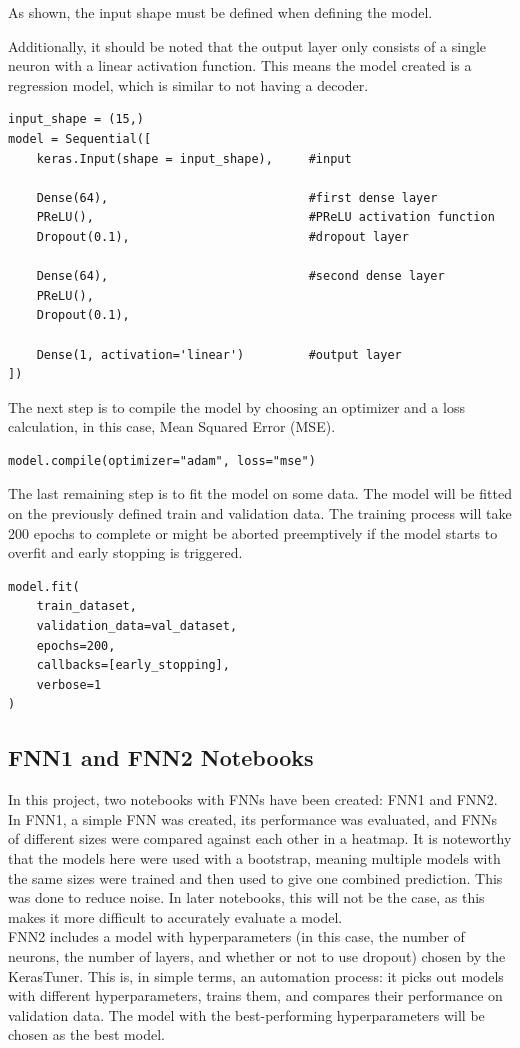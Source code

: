 \documentclass{article}
\begin{document}
As shown, the input shape must be defined when defining the model.

Additionally, it should be noted that the output layer only consists of a single neuron with a linear activation function. This means the model created is a regression model, which is similar to not having a decoder.
\begin{Verbatim}
input_shape = (15,)
model = Sequential([
    keras.Input(shape = input_shape),     #input

    Dense(64),                            #first dense layer
    PReLU(),                              #PReLU activation function
    Dropout(0.1),                         #dropout layer

    Dense(64),                            #second dense layer
    PReLU(),                                
    Dropout(0.1),                           

    Dense(1, activation='linear')         #output layer
])
\end{Verbatim}

The next step is to compile the model by choosing an optimizer and a loss calculation, in this case, Mean Squared Error (MSE).
\begin{Verbatim}
model.compile(optimizer="adam", loss="mse")
\end{Verbatim}

The last remaining step is to fit the model on some data. The model will be fitted on the previously defined train and validation data. The training process will take 200 epochs to complete or might be aborted preemptively if the model starts to overfit and early stopping is triggered.

\begin{Verbatim}
model.fit(
    train_dataset,
    validation_data=val_dataset,
    epochs=200,
    callbacks=[early_stopping],
    verbose=1
)
\end{Verbatim}

\subsection{FNN1 and FNN2 Notebooks}
In this project, two notebooks with FNNs have been created: FNN1 and FNN2. In FNN1, a simple FNN was created, its performance was evaluated, and FNNs of different sizes were compared against each other in a heatmap. It is noteworthy that the models here were used with a bootstrap, meaning multiple models with the same sizes were trained and then used to give one combined prediction. This was done to reduce noise. In later notebooks, this will not be the case, as this makes it more difficult to accurately evaluate a model.
\\[2em]
FNN2 includes a model with hyperparameters (in this case, the number of neurons, the number of layers, and whether or not to use dropout) chosen by the KerasTuner. This is, in simple terms, an automation process: it picks out models with different hyperparameters, trains them, and compares their performance on validation data. The model with the best-performing hyperparameters will be chosen as the best model.
\end{document}
